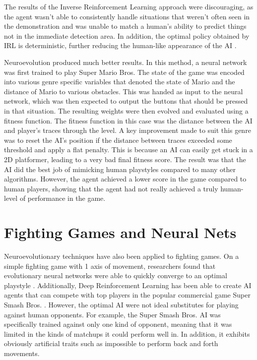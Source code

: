 The results of the Inverse Reinforcement Learning approach were discouraging, as the agent wasn't able to consistently handle situations that weren't often seen in the demonstration and was unable to match a human's ability to predict things not in the immediate detection area. In addition, the optimal policy obtained by IRL is deterministic, further reducing the human-like appearance of the AI \parencite{MarioImitation2}.

Neuroevolution produced much better results. In this method, a neural network was first trained to play Super Mario Bros. The state of the game was encoded into various genre specific variables that denoted the state of Mario and the distance of Mario to various obstacles. This was handed as input to the neural network, which was then expected to output the buttons that should be pressed in that situation. The resulting weights were then evolved and evaluated using a fitness function. The fitness function in this case was the distance between the AI and player's traces through the level. A key improvement made to suit this genre was to reset the AI's position if the distance between traces exceeded some threshold and apply a flat penalty. This is because an AI can easily get stuck in a 2D platformer, leading to a very bad final fitness score. The result was that the AI did the best job of mimicking human playstyles compared to many other algorithms. However, the agent achieved a lower score in the game compared to human players, showing that the agent had not really achieved a truly human-level of performance in the game.

\section{Fighting Games and Neural Nets}
Neuroevolutionary techniques have also been applied to fighting games. On a simple fighting game with 1 axis of movement, researchers found that evolutionary neural networks were able to quickly converge to an optimal playstyle \parencite{FightingAIComparison}. Additionally, Deep Reinforcement Learning has been able to create AI agents that can compete with top players in the popular commercial game Super Smash Bros. \parencite{SuperSmashBros}. However, the optimal AI were not ideal substitutes for playing against human opponents. For example, the Super Smash Bros. AI was specifically trained against only one kind of opponent, meaning that it was limited in the kinds of matchups it could perform well in. In addition, it exhibits obviously artificial traits such as impossible to perform back and forth movements.

